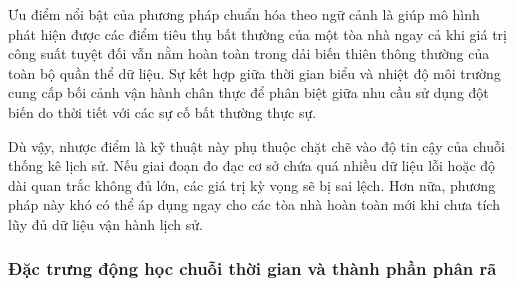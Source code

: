 Ưu điểm nổi bật của phương pháp chuẩn hóa theo ngữ cảnh là giúp mô hình phát hiện được các điểm tiêu thụ bất thường của một tòa nhà ngay cả khi giá trị công suất tuyệt đối vẫn nằm hoàn toàn trong dải biến thiên thông thường của toàn bộ quần thể dữ liệu. Sự kết hợp giữa thời gian biểu và nhiệt độ môi trường cung cấp bối cảnh vận hành chân thực để phân biệt giữa nhu cầu sử dụng đột biến do thời tiết với các sự cố bất thường thực sự.

Dù vậy, nhược điểm là kỹ thuật này phụ thuộc chặt chẽ vào độ tin cậy của chuỗi thống kê lịch sử. Nếu giai đoạn đo đạc cơ sở chứa quá nhiều dữ liệu lỗi hoặc độ dài quan trắc không đủ lớn, các giá trị kỳ vọng sẽ bị sai lệch. Hơn nữa, phương pháp này khó có thể áp dụng ngay cho các tòa nhà hoàn toàn mới khi chưa tích lũy đủ dữ liệu vận hành lịch sử.

\subsubsection{Đặc trưng động học chuỗi thời gian và thành phần phân rã}

